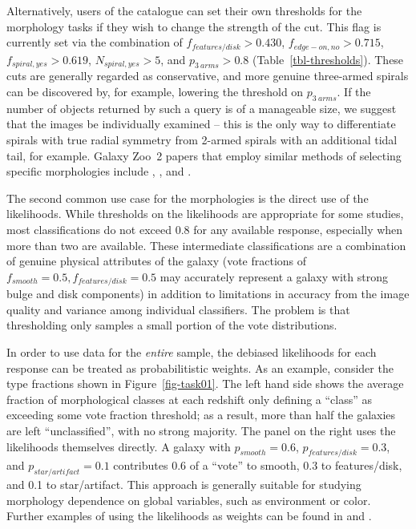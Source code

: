\documentclass[useAMS,usenatbib]{mn2e}
\begin{document}
Alternatively, users of the catalogue can set their own thresholds for the morphology tasks if they wish to change the strength of the cut. This flag is currently set via the combination of $f_{features/disk}>0.430$, $f_{edge-on,no}>0.715$, $f_{spiral,yes}>0.619$, $N_{spiral,yes}>5$, and $p_{3~arms}>0.8$ (Table~\ref{tbl-thresholds}). These cuts are generally regarded as conservative, and more genuine three-armed spirals can be discovered by, for example, lowering the threshold on $p_{3~arms}$. If the number of objects returned by such a query is of a manageable size, we suggest that the images be individually examined -- this is the only way to differentiate spirals with true radial symmetry from 2-armed spirals with an additional tidal tail, for example. Galaxy Zoo~2 papers that employ similar methods of selecting specific morphologies include \citet{mas11c}, \citet{kav12a}, and \citet{sim13}. 

The second common use case for the morphologies is the direct use of the likelihoods. While thresholds on the likelihoods are appropriate for some studies, most classifications do not exceed 0.8 for any available response, especially when more than two are available. These intermediate classifications are a combination of genuine physical attributes of the galaxy (vote fractions of $f_{smooth}=0.5,f_{features/disk}=0.5$ may accurately represent a galaxy with strong bulge and disk components) in addition to limitations in accuracy from the image quality and variance among individual classifiers. The problem is that thresholding only samples a small portion of the vote distributions.

In order to use data for the {\it entire} sample, the debiased likelihoods for each response can be treated as probabilitistic weights. As an example, consider the type fractions shown in Figure~\ref{fig-task01}. The left hand side shows the average fraction of morphological classes at each redshift only defining a ``class'' as exceeding some vote fraction threshold; as a result, more than half the galaxies are left ``unclassified'', with no strong majority. The panel on the right uses the likelihoods themselves directly. A galaxy with $p_{smooth}=0.6$, $p_{features/disk}=0.3$, and $p_{star/artifact}=0.1$ contributes 0.6 of a ``vote'' to smooth, 0.3 to features/disk, and 0.1 to star/artifact. This approach is generally suitable for studying morphology dependence on global variables, such as environment or color. Further examples of using the likelihoods as weights can be found in \citet{bam09} and \citet{ski12}.
\end{document}
